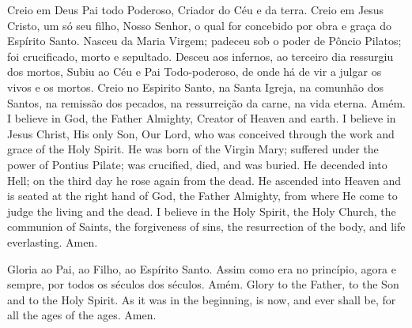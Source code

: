   \beginverse
    Creio em Deus Pai todo Poderoso,
    Criador do Céu e da terra.
    \parspace
    Creio em Jesus Cristo, um só seu filho, Nosso
    Senhor, o qual for concebido por obra e graça do
    Espírito Santo. Nasceu da Maria Virgem;
    padeceu sob o poder de Pôncio Pilatos;
    foi crucificado, morto e sepultado. Desceu aos
    infernos, ao terceiro dia ressurgiu dos mortos,
    Subiu ao Céu e Pai Todo-poderoso, de onde há de vir
    a julgar os vivos e os mortos.
    \parspace
    Creio no Espirito Santo, na Santa Igreja,
    na comunhão dos Santos, na remissão
    dos pecados, na ressurreição da carne,
    na vida eterna.
    \parspace
    Amém.
  \endverse
  \beginverse
    I believe in God, the Father Almighty,
    Creator of Heaven and earth.
    \parspace
    I believe in Jesus Christ, His only Son, Our Lord,
    who was conceived through the work and grace of
    the Holy Spirit. He was born of the Virgin Mary;
    suffered under the power of Pontius Pilate;
    was crucified, died, and was buried. He decended
    into Hell; on the third day he rose again from
    the dead. He ascended into Heaven and is seated
    at the right hand of God, the Father Almighty, from
    where He come to judge the living and the dead.
    \parspace
    I believe in the Holy Spirit, the Holy Church,
    the communion of Saints, the forgiveness of sins,
    the resurrection of the body, and life everlasting.
    \parspace
    Amen.
  \endverse
\endsong


  \beginverse
    \parspace
    Gloria ao Pai, ao Filho, ao Espírito Santo.
    Assim como era no princípio, agora e sempre,
    por todos os séculos dos séculos.
    \parspace
    Amém.
  \endverse
  \beginverse
    \parspace
    Glory to the Father, to the Son and to the Holy Spirit.
    As it was in the beginning, is now, and ever shall be,
    for all the ages of the ages.
    \parspace
    Amen.
  \endverse
\endsong


